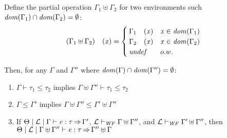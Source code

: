 \begin{lemma} %
  \label{lem:tyenv-weaken}
  Define the partial operation $ \Gamma_{{\mathrm{1}}}  \uplus  \Gamma_{{\mathrm{2}}} $ for two environments such $  \mathit{dom}( \Gamma_{{\mathrm{1}}} )   \cap   \mathit{dom}( \Gamma_{{\mathrm{2}}} )    =   \emptyset $:
  \[
    (   \Gamma_{{\mathrm{1}}}  \uplus  \Gamma_{{\mathrm{2}}}   ) \quad (  \mathit{x}  ) = \begin{cases}
      \Gamma_{{\mathrm{1}}} \quad (  \mathit{x}  ) &  \mathit{x}  \in   \mathit{dom}( \Gamma_{{\mathrm{1}}} )   \\
      \Gamma_{{\mathrm{2}}} \quad (  \mathit{x}  ) &  \mathit{x}  \in   \mathit{dom}( \Gamma_{{\mathrm{2}}} )   \\
      \textit{undef} & o.w.
    \end{cases}
  \]
  
  Then, for any $\Gamma$ and $\Gamma''$ where $  \mathit{dom}( \Gamma )   \cap   \mathit{dom}( \Gamma'' )    =   \emptyset $:
  \begin{enumerate}
  \item $\Gamma  \vdash  \tau_{{\mathrm{1}}}  \leq  \tau_{{\mathrm{2}}}$ implies $ \Gamma  \uplus  \Gamma''   \vdash  \tau_{{\mathrm{1}}}  \leq  \tau_{{\mathrm{2}}}$
  \item $\Gamma  \leq  \Gamma'$ implies $ \Gamma  \uplus  \Gamma''   \leq   \Gamma'  \uplus  \Gamma'' $
  \item If $ \Theta   \mid   \mathcal{L}   \mid   \Gamma   \vdash   \mathit{e}  :  \tau   \operatorname{\Rightarrow}   \Gamma' $, $ \mathcal{L}   \vdash _{\mathit{WF}}   \Gamma  \uplus  \Gamma''  $, and $ \mathcal{L}   \vdash _{\mathit{WF}}   \Gamma'  \uplus  \Gamma''  $, then $ \Theta   \mid   \mathcal{L}   \mid    \Gamma  \uplus  \Gamma''    \vdash   \mathit{e}  :  \tau   \operatorname{\Rightarrow}    \Gamma''  \uplus  \Gamma  $
  \end{enumerate}
\end{lemma}
